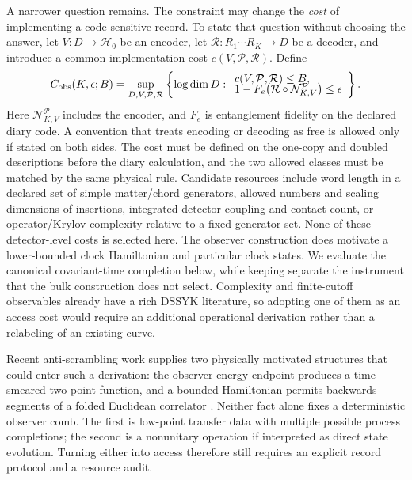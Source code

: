\documentclass[11pt]{article}
\newcommand{\cH}{\mathcal H}
\newcommand{\cN}{\mathcal N}
\newcommand{\cP}{\mathcal P}
\newcommand{\cR}{\mathcal R}
\begin{document}
A narrower question remains.  The constraint may change the \emph{cost} of
implementing a code-sensitive record.  To state that question without
choosing the answer, let $V:D\to\cH_0$ be an encoder, let
$\cR:R_1\cdots R_K\to D$ be a decoder, and introduce a common implementation
cost $c(V,\cP,\cR)$.  Define
\begin{equation}
  C_{\rm obs}(K,\epsilon;B)
  =\sup_{D,V,\cP,\cR}
    \left\{\log\dim D:\begin{array}{l}
      c(V,\cP,\cR)\leq B,\\[-1mm]
      1-F_e\!\left(\cR\circ\cN_{K,V}^{\cP}\right)\leq\epsilon
    \end{array}\right\}.
  \label{eq:Cobs}
\end{equation}
Here $\cN_{K,V}^{\cP}$ includes the encoder, and $F_e$ is entanglement fidelity
on the declared diary code.  A convention that treats encoding or decoding as
free is allowed only if stated on both sides.  The cost must be defined on the
one-copy and doubled descriptions before the diary calculation, and the two
allowed classes must be matched by the same physical rule.  Candidate
resources include word length in a declared set of simple matter/chord
generators, allowed numbers and scaling dimensions of insertions, integrated
detector coupling and contact count, or operator/Krylov complexity relative to
a fixed generator set.  None of these detector-level costs is selected here.
The observer construction does motivate a lower-bounded clock Hamiltonian and
particular clock states.  We evaluate the canonical covariant-time completion
below, while keeping separate the instrument that the bulk construction does
not select.  Complexity and finite-cutoff
observables already have a rich DSSYK literature, so adopting one of them as
an access cost would require an additional operational derivation rather than
a relabeling of an existing curve.

Recent anti-scrambling work supplies two physically motivated structures that
could enter such a derivation: the observer-energy endpoint produces a
time-smeared two-point function, and a bounded Hamiltonian permits backwards
segments of a folded Euclidean correlator
\citep{ChenStanfordTangYang2026,HarlowZhao2026}.  Neither fact alone fixes a
deterministic observer comb.  The first is low-point transfer data with
multiple possible process completions; the second is a nonunitary operation
if interpreted as direct state evolution.  Turning either into access
therefore still requires an explicit record protocol and a resource audit.
\end{document}
